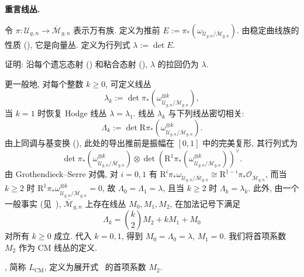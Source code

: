 \noindent\textbf{重言线丛.}
\begin{definition}\label{src:6.10.1}
令 $\pi:\mathcal U_{g,\allowbreak n}\to\overline{\mathcal M}_{g,\allowbreak n}$ 表示万有族. 定义为推前 $E:=\pi_*(\omega_{\mathcal U_{g,\allowbreak n}/\overline{\mathcal M}_{g,\allowbreak n}})$. 由稳定曲线族的性质 (), 它是向量丛. 定义为行列式 $\lambda:=\det E$.
\end{definition}
\begin{exercise}\label{src:6.10.2}
证明: 沿每个遗忘态射 () 和粘合态射 (), $\lambda$ 的拉回仍为 $\lambda$.
\end{exercise}
更一般地, 对每个整数 $k\geq0$, 可定义线丛
\[
\lambda_k:=\det\pi_*(\omega_{\mathcal U_{g,n}/\overline{\mathcal M}_{g,n}}^{\otimes k}),
\]
当 $k=1$ 时恢复 Hodge 线丛 $\lambda=\lambda_1$. 线丛 $\lambda_k$ 与下列线丛密切相关:
\[
\Lambda_k:=\det\mathrm R\pi_*(\omega_{\mathcal U_{g,n}/\overline{\mathcal M}_{g,n}}^{\otimes k}).
\]
由上同调与基变换 (), 此处的导出推前是振幅在 $[0,\allowbreak 1]$ 中的完美复形, 其行列式为
\[
\det\pi_*(\omega_{\mathcal U_{g,n}/\overline{\mathcal M}_{g,n}}^{\otimes k})\otimes\det(\mathrm R^1\pi_*(\omega_{\mathcal U_{g,n}/\overline{\mathcal M}_{g,n}}^{\otimes k}))^\vee.
\]
由 Grothendieck--Serre 对偶, 对 $i=0,\allowbreak 1$ 有 $\mathrm R^i\pi_*\omega_{\mathcal U_{g,\allowbreak n}/\overline{\mathcal M}_{g,\allowbreak n}}\cong\mathrm R^{1-i}\pi_*\mathcal O_{\overline{\mathcal M}_{g,\allowbreak n}}$, 而当 $k\geq2$ 时 $\mathrm R^1\pi_*\omega_{\mathcal U_{g,\allowbreak n}/\overline{\mathcal M}_{g,\allowbreak n}}^{\otimes k}=0$, 故 $\Lambda_0=\Lambda_1=\lambda$, 且当 $k\geq2$ 时 $\Lambda_k=\lambda_k$. 此外, 由一个一般事实 (见~\cite[定理 4]{KM76}), $\overline{\mathcal M}_{g,\allowbreak n}$ 上存在线丛 $M_0,\allowbreak M_1,\allowbreak M_2$, 在加法记号下满足
\begin{equation}\label{src:6.10.3}
\Lambda_k=\binom{k}{2}M_2+kM_1+M_0
\end{equation}
对所有 $k\geq0$ 成立. 代入 $k=0,\allowbreak 1$, 得到 $M_0=\Lambda_0=\lambda$, $M_1=0$. 我们将首项系数 $M_2$ 作为 CM 线丛的定义.
\begin{definition}[CM 线丛]\label{src:6.10.4}
, 简称  $L_{\mathrm{CM}}$, 定义为展开式~ 的首项系数 $M_2$.
\end{definition}
